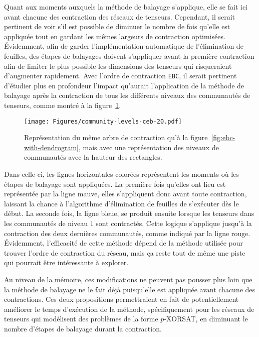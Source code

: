 Quant aux moments auxquels la méthode de balayage s'applique, elle se fait ici avant chacune des contraction des réseaux de tenseurs.
Cependant, il serait pertinent de voir s'il est possible de diminuer le nombre de fois qu'elle est appliquée tout en gardant les mêmes largeurs de contraction optimisées.
Évidemment, afin de garder l'implémentation automatique de l'élimination de feuilles, des étapes de balayages doivent s'appliquer avant la première contraction afin de limiter le plus possible les dimensions des tenseurs qui risqueraient d'augmenter rapidement.
Avec l'ordre de contraction \verb|EBC|, il serait pertinent d'étudier plus en profondeur l'impact qu'aurait l'application de la méthode de balayage après la contraction de tous les différents niveaux des communautés de tenseurs, comme montré à la figure~\ref{fig:less-sweeping-steps-ceb}.
\begin{figure}[h]
    \centering
    \texttt{[image: Figures/community-levels-ceb-20.pdf]}
    \caption{Représentation du même arbre de contraction qu'à la figure~\ref{fig:ebc-with-dendrogram}, mais avec une représentation des niveaux de communautés avec la hauteur des rectangles.}
    \label{fig:less-sweeping-steps-ceb}
\end{figure}
Dans celle-ci, les lignes horizontales colorées représentent les moments où les étapes de balayage sont appliquées.
La première fois qu'elles ont lieu est représentée par la ligne mauve, elles s'appliquent donc avant toute contraction, laissant la chance à l'algorithme d'élimination de feuilles de s'exécuter dès le début.
La seconde fois, la ligne bleue, se produit ensuite lorsque les tenseurs dans les communautés de niveau $1$ sont contractés.
Cette logique s'applique jusqu'à la contraction des deux dernières communautés, comme indiqué par la ligne rouge.
Évidemment, l'efficacité de cette méthode dépend de la méthode utilisée pour trouver l'ordre de contraction du réseau, mais ça reste tout de même une piste qui pourrait être intéressante à explorer.

Au niveau de la mémoire, ces modifications ne peuvent pas pousser plus loin que la méthode de balayage ne le fait déjà puisqu'elle est appliquée avant chacune des contractions.
Ces deux propositions permettraient en fait de potentiellement améliorer le temps d'exécution de la méthode, spécifiquement pour les réseaux de tenseurs qui modélisent des problèmes de la forme $p$-XORSAT, en diminuant le nombre d'étapes de balayage durant la contraction.
